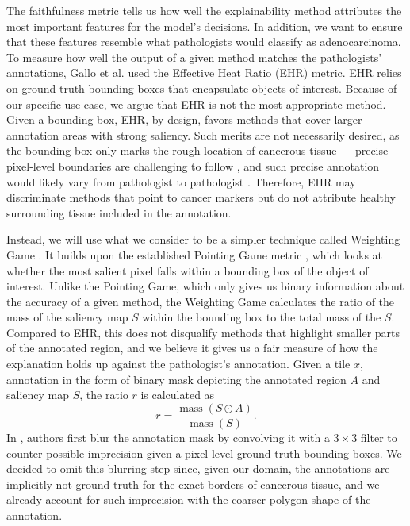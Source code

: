 The faithfulness metric tells us how well the explainability method attributes the most important features for the model's decisions.
In addition, we want to ensure that these features resemble what pathologists would classify as adenocarcinoma.
To measure how well the output of a given method matches the pathologists' annotations, Gallo et al. \cite{gallo} used the Effective Heat Ratio (EHR) \cite{ehr} metric.
EHR relies on ground truth bounding boxes that encapsulate objects of interest.
Because of our specific use case, we argue that EHR is not the most appropriate method.
Given a bounding box, EHR, by design, favors methods that cover larger annotation areas with strong saliency.
Such merits are not necessarily desired, as the bounding box only marks the rough location of cancerous tissue --- precise pixel-level boundaries are challenging to follow \cite{gallo, annotation-agreement}, and such precise annotation would likely vary from pathologist to pathologist \cite{annotation-agreement}.
Therefore, EHR may discriminate methods that point to cancer markers but do not attribute healthy surrounding tissue included in the annotation.

Instead, we will use what we consider to be a simpler technique called Weighting Game \cite{weighting-game}.
It builds upon the established Pointing Game metric \cite{pointing-game}, which looks at whether the most salient pixel falls within a bounding box of the object of interest.
Unlike the Pointing Game, which only gives us binary information about the accuracy of a given method, the Weighting Game calculates the ratio of the mass of the saliency map $S$ within the bounding box to the total mass of the $S$.
Compared to EHR, this does not disqualify methods that highlight smaller parts of the annotated region, and we believe it gives us a fair measure of how the explanation holds up against the pathologist's annotation.
Given a tile $x$, annotation in the form of binary mask depicting the annotated region $A$ and saliency map $S$, the ratio $r$ is calculated as
\begin{equation}\label{eq:wg}
    r = \frac{\operatorname{\text{mass}}(S \odot A)}{\operatorname{\text{mass}}(S)}.
\end{equation}
In \cite{weighting-game}, authors first blur the annotation mask by convolving it with a $3 \times 3$ filter to counter possible imprecision given a pixel-level ground truth bounding boxes.
We decided to omit this blurring step since, given our domain, the annotations are implicitly not ground truth for the exact borders of cancerous tissue, and we already account for such imprecision with the coarser polygon shape of the annotation.

